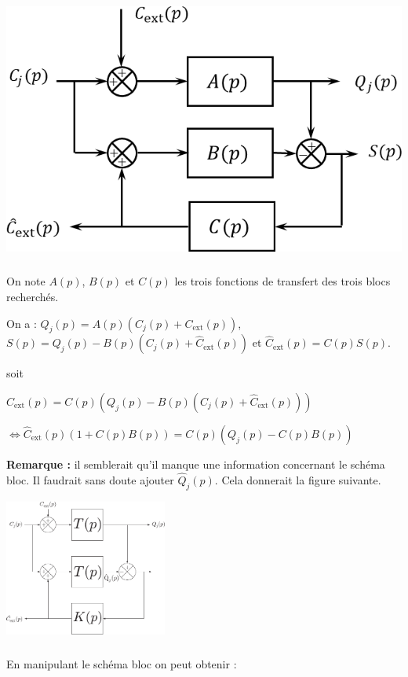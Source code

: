 \documentclass[10pt,fleqn]{article} %
\begin{document}
\begin{center}
\includegraphics[width=.4\linewidth]{images/fig_04}
\end{center}

\subparagraph{}%
On note $A(p)$, $B(p)$ et $C(p)$ les trois fonctions de transfert des trois blocs recherchés. 


On a : $Q_j(p)=A(p)\left(C_j(p)+C_{\text{ext}}(p)\right)$, 
$S(p)=Q_j(p)-B(p)\left( C_j(p)+\hat{C}_{\text{ext}}(p) \right)$
et  $\hat{C}_{\text{ext}}(p)=C(p)S(p)$.

 soit 

$\hat{C}_{\text{ext}}(p)=C(p)\left(Q_j(p)-B(p)\left( C_j(p)+\hat{C}_{\text{ext}}(p) \right)\right)$

$\Leftrightarrow \hat{C}_{\text{ext}}(p) \left(1+ C(p)B(p)\right)=C(p)\left(Q_j(p)-C(p)B(p) \right)$

\textbf{Remarque :} il semblerait qu'il manque une information concernant le schéma bloc. Il faudrait sans doute ajouter $\hat{Q}_j(p)$. Cela donnerait la figure suivante.

\begin{center}
\includegraphics[width=0.4\textwidth]{images/DR_B_corrige.pdf}
\end{center}

\subparagraph{}%

En manipulant le schéma bloc on peut obtenir : 
\end{document}
